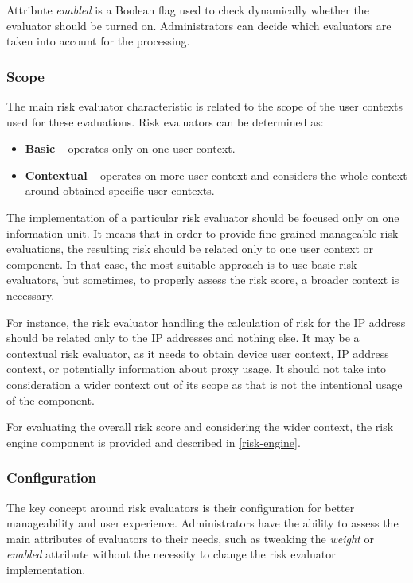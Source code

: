 Attribute \textit{enabled} is a Boolean flag used to check dynamically whether
the evaluator should be turned on.
Administrators can decide which evaluators are taken into account for the processing.

\subsubsection{Scope}
The main risk evaluator characteristic is related to the scope of the user contexts used for these evaluations.
\newline
\newline
Risk evaluators can be determined as:

\begin{itemize}
    \item \textbf{Basic} -- operates only on one user context.
    \item \textbf{Contextual} -- operates on more user context and considers the whole context around obtained specific user contexts.
\end{itemize}

The implementation of a particular risk evaluator should be focused only on one information unit.
It means that in order to provide fine-grained manageable risk evaluations, the resulting risk should be related only to one user context or component.
In that case, the most suitable approach is to use basic risk evaluators, but sometimes, to properly assess the risk score, a broader context is necessary.

For instance, the risk evaluator handling the calculation of risk for the IP address should be related only to the IP addresses and nothing else.
It may be a contextual risk evaluator, as it needs to obtain device user context, IP address context, or potentially information about proxy usage.
It should not take into consideration a wider context out of its scope as that is not the intentional usage of the component.

For evaluating the overall risk score and considering the wider context, the risk engine component is provided and described in \ref{risk-engine}.

\newpage

\subsubsection{Configuration} \label{design-risk-eval-config}
The key concept around risk evaluators is their configuration for better manageability and user experience.
Administrators have the ability to assess the main attributes of evaluators to their needs, such as tweaking the \textit{weight} or \textit{enabled} attribute without the necessity to change the risk evaluator implementation.

